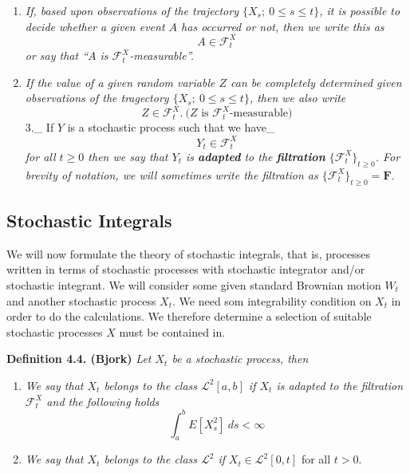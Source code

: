\documentclass[
]{book}
\providecommand{\tightlist}{%
  \setlength{\itemsep}{0pt}\setlength{\parskip}{0pt}}
\begin{document}
\begin{enumerate}
\def\labelenumi{\arabic{enumi}.}
\tightlist
\item
  \emph{If, based upon observations of the trajectory \(\{X_s;\ 0\le s\le t\}\), it is possible to decide whether a given event \(A\) has occurred or not, then we write this as}
  \[
    A\in\mathcal{F}^X_t
    \]
  \emph{or say that ``\(A\) is \(\mathcal{F}^X_t\)-measurable''.}
\item
  \emph{If the value of a given random variable \(Z\) can be completely determined given observations of the tragectory \(\{X_s;\ 0\le s\le t\}\), then we also write}
  \[
    Z\in\mathcal{F}^X_t.\ \text{(}Z\text{ is }\mathcal{F}^X_t\text{-measurable)}
    \]
  3.\_ If \(Y\) is a stochastic process such that we have\_
  \[
    Y_t\in\mathcal{F}^X_t
    \]
  \emph{for all \(t\ge0\) then we say that \(Y_t\) is \textbf{adapted} to the \textbf{filtration} \(\{\mathcal{F}^X_t\}_{t\ge 0}\). For brevity of notation, we will sometimes write the filtration as \(\{\mathcal{F}^X_t\}_{t\ge 0}=\mathbf{F}\).}
\end{enumerate}

\hypertarget{stochastic-integrals-1}{%
\subsection{Stochastic Integrals}\label{stochastic-integrals-1}}

We will now formulate the theory of stochastic integrals, that is, processes written in terms of stochastic processes with stochastic integrator and/or stochastic integrant. We will consider some given standard Brownian motion \(W_t\) and another stochastic process \(X_t\). We need som integrability condition on \(X_t\) in order to do the calculations. We therefore determine a selection of suitable stochastic processes \(X\) must be contained in.

\textbf{Definition 4.4. (Bjork)} \emph{Let \(X_t\) be a stochastic process, then}

\begin{enumerate}
\def\labelenumi{\roman{enumi}.}
\tightlist
\item
  \emph{We say that \(X_t\) belongs to the class \(\mathcal{L}^2[a,b]\) if \(X_t\) is adapted to the filtration \(\mathcal{F}^X_t\) and the following holds}
  \[\int_a^bE[X_s^2]\ ds<\infty\]
\item
  \emph{We say that \(X_t\) belongs to the class \(\mathcal{L}^2\) if} \(X_t\in\mathcal{L}^2[0,t]\) for all \(t>0\).
\end{enumerate}
\end{document}
